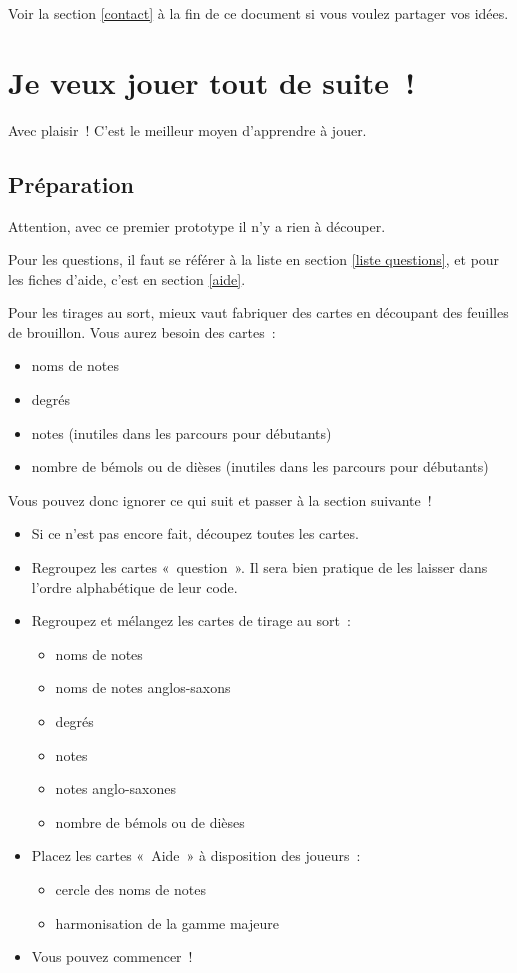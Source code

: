 \documentclass[11pt]{article}
\begin{document}
Voir la section \ref{contact} à la fin de ce document si vous voulez partager
vos idées.

\section{Je veux jouer tout de suite !}

Avec plaisir ! C’est le meilleur moyen d’apprendre à jouer.

\subsection{Préparation}

Attention, avec ce premier prototype il n’y a rien à découper.

Pour les questions, il faut se référer à la liste en section
\ref{liste questions}, et pour les fiches d’aide, c’est en section
\ref{aide}.

Pour les tirages au sort, mieux vaut fabriquer des cartes en découpant des
feuilles de brouillon. Vous aurez besoin des cartes :

\begin{itemize}
\item noms de notes
\item degrés
\item notes (inutiles dans les parcours pour débutants)
\item nombre de bémols ou de dièses (inutiles dans les parcours pour débutants)
\end{itemize}

Vous pouvez donc ignorer ce qui suit et passer à la section suivante !

\begin{itemize}
\item Si ce n’est pas encore fait, découpez toutes les cartes.
\item Regroupez les cartes « question ». Il sera bien pratique de les laisser
    dans l’ordre alphabétique de leur code.
\item Regroupez et mélangez les cartes de tirage au sort :
    \begin{itemize}
    \item noms de notes
    \item noms de notes anglos-saxons
    \item degrés
    \item notes
    \item notes anglo-saxones
    \item nombre de bémols ou de dièses
    \end{itemize}
\item Placez les cartes « Aide » à disposition des joueurs :
    \begin{itemize}
    \item cercle des noms de notes
    \item harmonisation de la gamme majeure
    \end{itemize}
\item Vous pouvez commencer !
\end{itemize}
\end{document}
